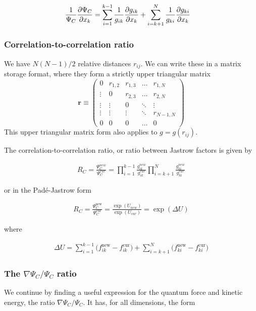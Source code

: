 \documentclass[x11names]{article}
\begin{document}
			\begin{align}
				\frac{1}{\Psi_C}\pdv{\Psi_C}{x_k} &= \sum_{i=1}^{k-1}\frac{1}{g_{ik}}\pdv{g_{ik}}{x_k} +  \sum_{i=k+1}^{N}\frac{1}{g_{ki}}\pdv{g_{ki}}{x_k}
			\end{align}

		\subsubsection{Correlation-to-correlation ratio}
			We have $N\left(N-1\right)/2$ relative distances $r_{ij}$. We can
			write these in a matrix storage format, where they form a strictly
			upper triangular matrix
			\[
			\mathbf{r}\equiv\left(\begin{array}{ccccc}
			0 & r_{1,2} & r_{1,3} & \dots & r_{1,N}\\
			\vdots & 0 & r_{2,3} & \dots & r_{2,N}\\
			\vdots & \vdots & 0 & \ddots & \vdots\\
			\vdots & \vdots & \vdots & \ddots & r_{N-1,N}\\
			0 & 0 & 0 & \dots & 0
			\end{array}\right)
			\]
			This upper triangular matrix form also applies to $g=g\left(r_{ij}\right)$.

			The correlation-to-correlation ratio, or ratio between Jastrow factors
			is given by

			\begin{align}
				R_{C}=\frac{\Psi_{C}^{new}}{\Psi_{C}^{cur}}=\prod_{i=1}^{k-1}\frac{g_{ik}^{new}}{g_{ik}^{cur}}\prod_{i=k+1}^{N}\frac{g_{ki}^{new}}{g_{ki}^{cur}}
			\end{align}

			or in the Padé-Jastrow form

			\begin{align}
				R_{C}=\frac{\Psi_{C}^{\mathrm{new}}}{\Psi_{C}^{\mathrm{cur}}}=\frac{\exp\left(U_{new}\right)}{\exp\left(U_{cur}\right)}=\exp\left(\Delta U\right)
			\end{align}

			where

			\begin{align}
				\Delta U =
				\sum_{i=1}^{k-1}\big(f_{ik}^\mathrm{new}-f_{ik}^\mathrm{cur}\big)
				+
				\sum_{i=k+1}^{N}\big(f_{ki}^\mathrm{new}-f_{ki}^\mathrm{cur}\big)
			\end{align}

		\subsubsection{The $\nabla \Psi_{C}/\Psi_{C}$ ratio}
			We continue by finding a useful expression for the quantum force and kinetic energy, the ratio $\nabla\Psi_{C}/\Psi_{C}$. It has,
			for all dimensions, the form
\end{document}
